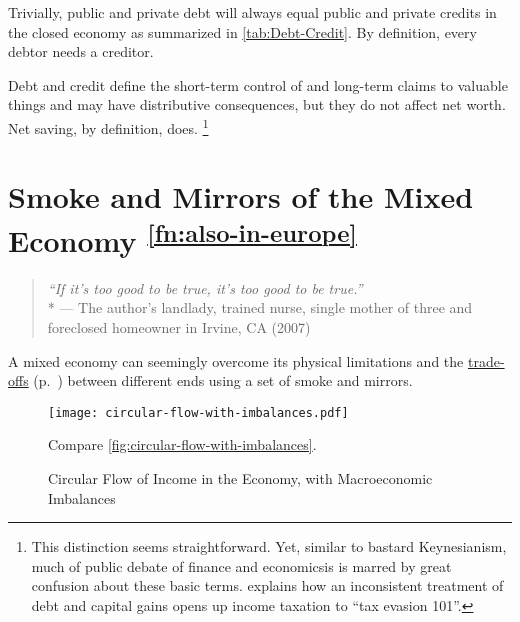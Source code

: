 \begin{enumerate}
	Trivially, public and private debt will always equal public and private credits in the closed economy as summarized in \autoref{tab:Debt-Credit}.
By definition, every debtor needs a creditor.

	Debt and credit define the short-term control of and long-term claims to valuable things and may have distributive consequences, but they do not affect net worth.
Net saving, by definition, does.
\footnote{
	This distinction seems straightforward.
	Yet, similar to bastard Keynesianism, much of public debate of finance and economicsis is marred by great confusion about these basic terms.
	\citealt{McCaffery2005} explains how an inconsistent treatment of debt and capital gains opens up income taxation to ``tax evasion 101''.
}
\end{enumerate}

\section[Smoke \& Mirrors]{Smoke and Mirrors of the Mixed Economy \textsuperscript{\ref{fn:also-in-europe}}} \label{sec:smoke-n-mirrors}

\begin{quote}
	\emph{``If it's too good to be true, it's too good to be true.''}
	\\*
	--- The author's landlady, trained nurse, single mother of three and foreclosed homeowner in Irvine, CA (2007)
\end{quote}


A mixed economy can seemingly overcome its physical limitations and the \hyperref[sec:trade-offs]{trade-offs} (p.~\pageref{sec:trade-offs}) between different ends using a set of smoke and mirrors.

\begin{figure}[htbp]
	\centering
	\texttt{[image: circular-flow-with-imbalances.pdf]}
	\caption[Circular Flow in the Economy, with Imbalances]{Circular Flow of Income in the Economy, with Macroeconomic Imbalances}
	\begin{flushleft}
		\scriptsize{Compare \autoref{fig:circular-flow-with-imbalances}.}
	\end{flushleft}
	\label{fig:circular-flow-with-imbalances}
\end{figure}

